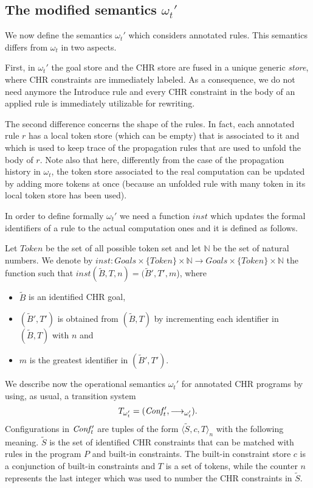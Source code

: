 \documentclass[final]{acmtrans2e}
\newcommand{\rrarrow}{\longrightarrow}
\begin{document}
\subsection{The  modified semantics $\omega_t'$}
We now define the semantics $\omega_t'$ which considers annotated rules.
This semantics differs from $\omega_t$ in two aspects.

First, in $\omega_t'$
the goal store and the CHR store are fused in a unique generic \emph{store}, where
CHR constraints are immediately labeled. As a consequence, we do not
need anymore the Introduce rule and every CHR
constraint in the body of an applied rule is immediately
utilizable for rewriting.

The second difference concerns the shape of the rules. In fact,
each annotated rule $r$ has  a local token store (which can be
empty) that is associated to it and which is used to keep trace of
the propagation rules that are used to unfold the body of $r$.
Note also that here, differently from the case of the propagation
history in $\omega_t$, the token store associated to
 the real computation can be updated
by adding more tokens at once (because an unfolded rule with many
token in its local token store has been used).

In order to define formally $\omega_t'$
we need a function $inst$  which updates
the formal identifiers of a rule to the actual computation ones and it
is defined as follows.

\begin{definition}\label{definst}
 Let $Token$ be the set of all possible token
set and let $\mathbb{N}$ be the set of natural numbers. We denote
by $inst: Goals \times \{Token\}\times \mathbb{N}  \rightarrow
Goals \times \{Token\}\times \mathbb{N}$ the function such that
$inst(\tilde B,T,n)=(\tilde B', T',m$), where
\begin{itemize}
    \item $\tilde B$ is an identified CHR goal,
    \item $(\tilde B', T') $ is obtained from $(\tilde B, T)$ by
    incrementing each identifier in $(\tilde B, T)$ with $n$ and
    \item $m$ is the greatest identifier in $(\tilde B', T')$.
\end{itemize}
\end{definition}

We describe now the operational semantics $\omega_t'$  for annotated CHR
programs  by using, as usual, a transition system
\[T_{\omega'_t}= ({\it Conf'_{t}}, \rrarrow_{\omega'_t}).\] Configurations in
${\it Conf'_t}$ are tuples of the form $\langle \tilde S,c,
T\rangle_n$ with the following meaning.  $\tilde S$ is the set of
identified CHR constraints that can be matched with rules in the
program $P$ and built-in constraints. The built-in constraint
store $c$ is a conjunction of built-in constraints and $T$ is a
set of tokens, while the counter $n$ represents the last integer
which  was used to number  the CHR constraints in $\tilde S$.
\end{document}
